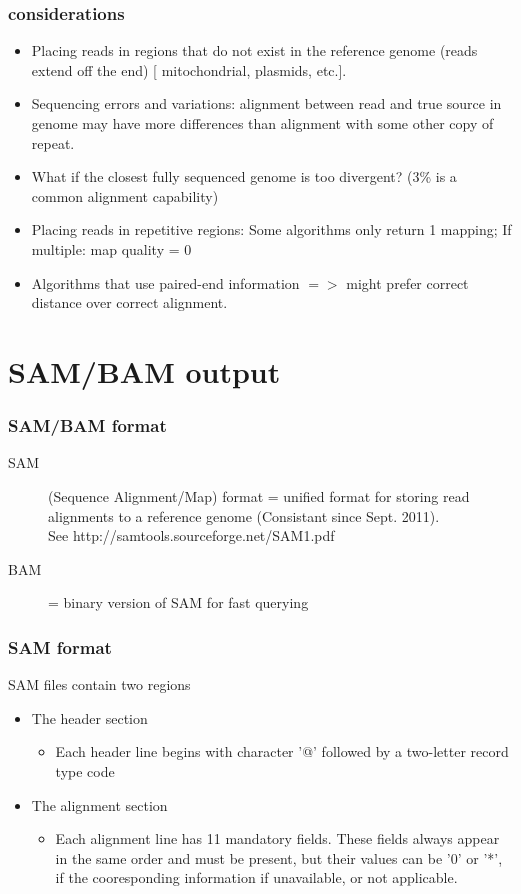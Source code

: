 \documentclass[pdf]{beamer}
\begin{document}
\begin{frame}
\frametitle{considerations}
\begin{itemize}
\item Placing reads in regions that do not exist in the reference genome (reads extend off the end) [ mitochondrial, plasmids, etc.].
\item Sequencing errors and variations: alignment between read and true source in genome may have more differences than alignment with some other copy of repeat.
\item What if the closest fully sequenced genome is too divergent? (3\% is a common alignment capability)
\item Placing reads in repetitive regions: Some algorithms only return 1 mapping; If multiple: map quality = 0
\item Algorithms that use paired-end information $=>$ might prefer correct distance over correct alignment.
\end{itemize}
\end{frame}

\section{SAM/BAM output}
\begin{frame}
\frametitle{SAM/BAM format}
\begin{description}
\item [SAM] (Sequence Alignment/Map) format = unified format for storing read alignments to a reference genome (Consistant since Sept. 2011).\\
See http://samtools.sourceforge.net/SAM1.pdf
\item [BAM] = binary version of SAM for fast querying
\end{description}
\end{frame}

\begin{frame}
\frametitle{SAM format}
SAM files contain two regions
\begin{itemize}
\item The header section
\begin{itemize}
\item Each header line begins with character '@' followed by a two-letter record type code
\end{itemize}
\item The alignment section
\begin{itemize}
\item Each alignment line has 11 mandatory fields. These fields always appear in the same order and must be present, but their values can be '0' or '*', if the cooresponding information if unavailable, or not applicable.
\end{itemize}
\end{itemize}
\end{frame}
\end{document}
